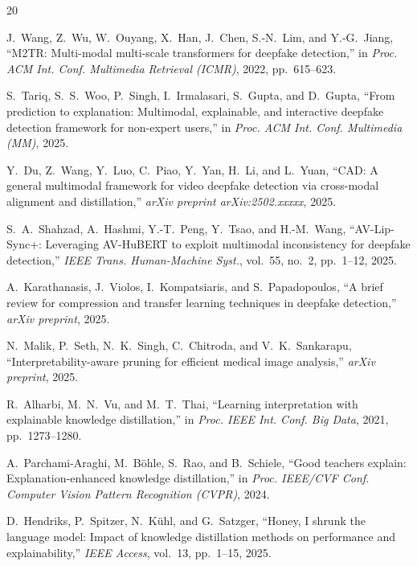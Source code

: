 \documentclass[lettersize,journal]{IEEEtran}
\begin{document}
\begin{thebibliography}{20}


J.~Wang, Z.~Wu, W.~Ouyang, X.~Han, J.~Chen, S.-N.~Lim, and Y.-G.~Jiang, ``M2TR: Multi-modal multi-scale transformers for deepfake detection,'' in \emph{Proc. ACM Int. Conf. Multimedia Retrieval (ICMR)}, 2022, pp.~615--623.

S.~Tariq, S.~S.~Woo, P.~Singh, I.~Irmalasari, S.~Gupta, and D.~Gupta, ``From prediction to explanation: Multimodal, explainable, and interactive deepfake detection framework for non-expert users,'' in \emph{Proc. ACM Int. Conf. Multimedia (MM)}, 2025.

Y.~Du, Z.~Wang, Y.~Luo, C.~Piao, Y.~Yan, H.~Li, and L.~Yuan, ``CAD: A general multimodal framework for video deepfake detection via cross-modal alignment and distillation,'' \emph{arXiv preprint arXiv:2502.xxxxx}, 2025.

S.~A.~Shahzad, A.~Hashmi, Y.-T.~Peng, Y.~Tsao, and H.-M.~Wang, ``AV-Lip-Sync+: Leveraging AV-HuBERT to exploit multimodal inconsistency for deepfake detection,'' \emph{IEEE Trans. Human-Machine Syst.}, vol.~55, no.~2, pp.~1--12, 2025.

A.~Karathanasis, J.~Violos, I.~Kompatsiaris, and S.~Papadopoulos, ``A brief review for compression and transfer learning techniques in deepfake detection,'' \emph{arXiv preprint}, 2025.

N.~Malik, P.~Seth, N.~K.~Singh, C.~Chitroda, and V.~K.~Sankarapu, ``Interpretability-aware pruning for efficient medical image analysis,'' \emph{arXiv preprint}, 2025.

R.~Alharbi, M.~N.~Vu, and M.~T.~Thai, ``Learning interpretation with explainable knowledge distillation,'' in \emph{Proc. IEEE Int. Conf. Big Data}, 2021, pp.~1273--1280.

A.~Parchami-Araghi, M.~B\"ohle, S.~Rao, and B.~Schiele, ``Good teachers explain: Explanation-enhanced knowledge distillation,'' in \emph{Proc. IEEE/CVF Conf. Computer Vision Pattern Recognition (CVPR)}, 2024.

D.~Hendriks, P.~Spitzer, N.~K\"uhl, and G.~Satzger, ``Honey, I shrunk the language model: Impact of knowledge distillation methods on performance and explainability,'' \emph{IEEE Access}, vol.~13, pp.~1--15, 2025.


\end{thebibliography}
\end{document}
